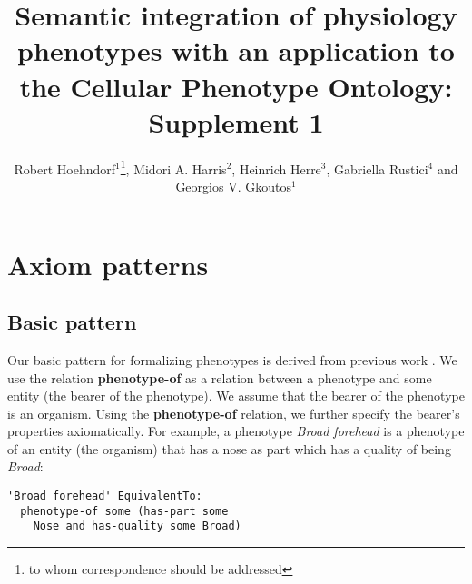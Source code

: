 \documentclass{bioinfo}
\renewcommand{\cite}{\citep}
\begin{document}

\title[Physiology phenotypes]{Semantic integration of physiology
  phenotypes with an application to the Cellular Phenotype Ontology:
  Supplement 1}

\author[Hoehndorf \textit{et~al}]{Robert Hoehndorf$^{1}$\footnote{to
    whom correspondence should be addressed}, Midori
  A. Harris$^2$, Heinrich Herre$^3$, Gabriella Rustici$^4$ and
  Georgios V. Gkoutos$^{1}$}

\address{$^{1}$Department of Genetics, University of Cambridge,
  Downing Street, Cambridge, Cambridge CB2 3EH, UK\\
  $^{2}$Department of Biochemistry; University of Cambridge, 80 Tennis
  Court Road, Cambridge CB2 1GA, UK\\
  $^{3}$Institute for Medical Informatics, Statistics and
  Epidemiology, University of Leipzig, Haertelstrasse 16-18, 04107
  Leipzig, Germany\\
  $^{4}$European Bioinformatics Institute, Wellcome Trust Genome
  Campus, Hinxton, Cambridge, Cambridge CB10 1SD, UK}



\maketitle

\section{Axiom patterns}

\subsection{Basic pattern}
Our basic pattern for formalizing phenotypes is derived from previous
work \cite{Hoehndorf2010phene}. We use the relation {\bf phenotype-of}
as a relation between a phenotype and some entity (the bearer of the
phenotype). We assume that the bearer of the phenotype is an
organism. Using the {\bf phenotype-of} relation, we further specify
the bearer's properties axiomatically. For example, a phenotype {\em
  Broad forehead} is a phenotype of an entity (the organism) that has
a nose as part which has a quality of being {\em Broad}:
\begin{verbatim}
'Broad forehead' EquivalentTo:
  phenotype-of some (has-part some
    Nose and has-quality some Broad)
\end{verbatim}
\end{document}
